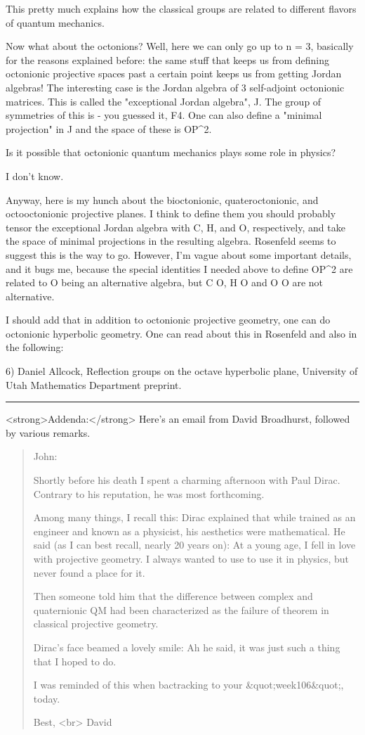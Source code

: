 This pretty much explains
how the classical groups are related to different flavors of quantum
mechanics.

Now what about the octonions?  Well, here we can only go up to n = 3,
basically for the reasons explained before: the same stuff that keeps
us from defining octonionic projective spaces past a certain point
keeps us from getting Jordan algebras!  The interesting case is the
Jordan algebra of 3 self-adjoint octonionic matrices.  This is
called the "exceptional Jordan algebra", J.  The group of symmetries
of this is - you guessed it, F4.  One can also define a "minimal
projection" in J and the space of these is OP^{2}.

Is it possible that octonionic quantum mechanics plays some role in
physics?

I don't know.

Anyway, here is my hunch about the bioctonionic, quateroctonionic, and
octooctonionic projective planes.  I think to define them you should
probably tensor the exceptional Jordan algebra with C, H, and O,
respectively, and take the space of minimal projections in the
resulting algebra.  Rosenfeld seems to suggest this is the way to go.
However, I'm vague about some important details, and it bugs me,
because the special identities I needed above to define OP^{2} are
related to O being an alternative algebra, but C \otimes  O, H \otimes  O
and O \otimes  O are not alternative.

I should add that in addition to octonionic projective geometry, one
can do octonionic hyperbolic geometry.  One can read about this in
Rosenfeld and also in the following:

6) Daniel Allcock, Reflection groups on the octave hyperbolic plane,
University of Utah Mathematics Department preprint.


\par\noindent\rule{\textwidth}{0.4pt}

<strong>Addenda:</strong> Here's an email from David Broadhurst,
followed by various remarks.

\begin{quote}
John:

Shortly before his death I spent a charming afternoon with Paul Dirac.
Contrary to his reputation, he was most forthcoming.

Among many things, I recall this: Dirac explained that while trained
as an engineer and known as a physicist, his aesthetics were mathematical.
He said (as I can best recall, nearly 20 years on): At a young age,
I fell in love with projective geometry.
I always wanted to use to use it in physics, but never found a place for it.

Then someone told him that the difference between complex and quaternionic
QM had been characterized as the failure of theorem in
classical projective geometry.

Dirac's face beamed a lovely smile: Ah he said, it was just such a thing
that I hoped to do.

I was reminded of this when bactracking to your &quot;week106&quot;, today.

Best, <br>
David
\end{quote}
    

